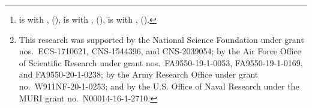 \documentclass[letterpaper, 10pt, conference]{ieeeconf}
\begin{document}
\title{}

\author{
    \authorblockN{}
    \and
    \authorblockN{}
    \and
    \authorblockN{}
    \thanks{
        \protect is with
        \protect,
        \protect
        (\protect),
        \protect is with 
        \protect,
        \protect 
        (\protect),
        \protect is with 
        \protect,
        \protect 
        (\protect).
    }
    \thanks{
        This research was supported by the National Science Foundation under grant nos.\ ECS-1710621, CNS-1544396, and CNS-2039054; by the Air Force Office of Scientific Research under grant nos.\ FA9550-19-1-0053, FA9550-19-1-0169, and FA9550-20-1-0238; by the Army Research Office under grant no.\ W911NF-20-1-0253; and by the U.S. Office of Naval Research under the MURI grant no.\ N00014-16-1-2710.
    }
}
\maketitle


\end{document}
